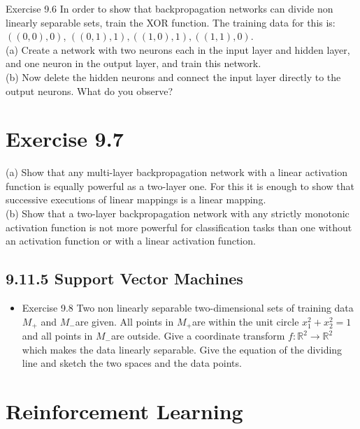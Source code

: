 \documentclass[10pt]{book}
\begin{document}
\begin{center}
\begin{enumerate}
\begin{center}
\begin{center}
\begin{center}
Exercise 9.6 In order to show that backpropagation networks can divide non linearly separable sets, train the XOR function. The training data for this is: $((0,0), 0)$, $((0,1), 1),((1,0), 1),((1,1), 0)$.\\
(a) Create a network with two neurons each in the input layer and hidden layer, and one neuron in the output layer, and train this network.\\
(b) Now delete the hidden neurons and connect the input layer directly to the output neurons. What do you observe?

\section*{Exercise 9.7}
(a) Show that any multi-layer backpropagation network with a linear activation function is equally powerful as a two-layer one. For this it is enough to show that successive executions of linear mappings is a linear mapping.\\
(b) Show that a two-layer backpropagation network with any strictly monotonic activation function is not more powerful for classification tasks than one without an activation function or with a linear activation function.

\subsection*{9.11.5 Support Vector Machines}
\begin{itemize}
  \item Exercise 9.8 Two non linearly separable two-dimensional sets of training data $M_{+}$ and $M_{-}$are given. All points in $M_{+}$are within the unit circle $x_{1}^{2}+x_{2}^{2}=1$ and all points in $M_{-}$are outside. Give a coordinate transform $f: \mathbb{R}^{2} \rightarrow \mathbb{R}^{2}$ which makes the data linearly separable. Give the equation of the dividing line and sketch the two spaces and the data points.
\end{itemize}

\section*{Reinforcement Learning}

\end{center}
\end{center}
\end{center}
\end{enumerate}
\end{center}
\end{document}
